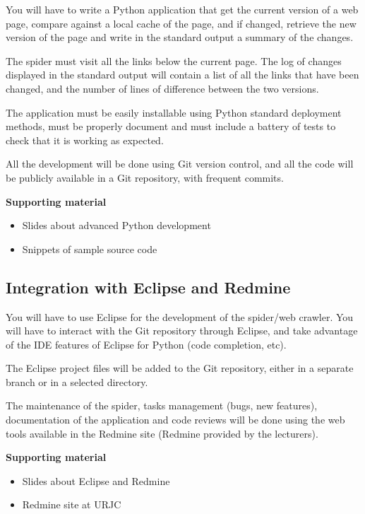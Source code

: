 \documentclass[a4paper]{article}
\begin{document}
You will have to write a Python application that get the current
version of a web page, compare against a local cache of the page, and
if changed, retrieve the new version of the page and write in the
standard output a summary of the changes.

The spider must visit all the links below the current page. The log of
changes displayed in the standard output will contain a list of all
the links that have been changed, and the number of lines of
difference between the two versions.

The application must be easily installable using Python standard
deployment methods, must be properly document and must include a
battery of tests to check that it is working as expected.

All the development will be done using Git version control, and all
the code will be publicly available in a Git repository, with frequent
commits.

\textbf{Supporting material}

\begin{itemize}
\item Slides about advanced Python development
\item Snippets of sample source code
\end{itemize}

\subsection{Integration with Eclipse and Redmine}
\label{sub:eclipse}

You will have to use Eclipse for the development of the spider/web
crawler. You will have to interact with the Git repository through
Eclipse, and take advantage of the IDE features of Eclipse for Python
(code completion, etc).

The Eclipse project files will be added to the Git repository, either
in a separate branch or in a selected directory.

The maintenance of the spider, tasks management (bugs, new features),
documentation of the application and code reviews will be done using
the web tools available in the Redmine site (Redmine provided by the
lecturers).

\textbf{Supporting material}

\begin{itemize}
\item Slides about Eclipse and Redmine
\item Redmine site at URJC
\end{itemize}
\end{document}
